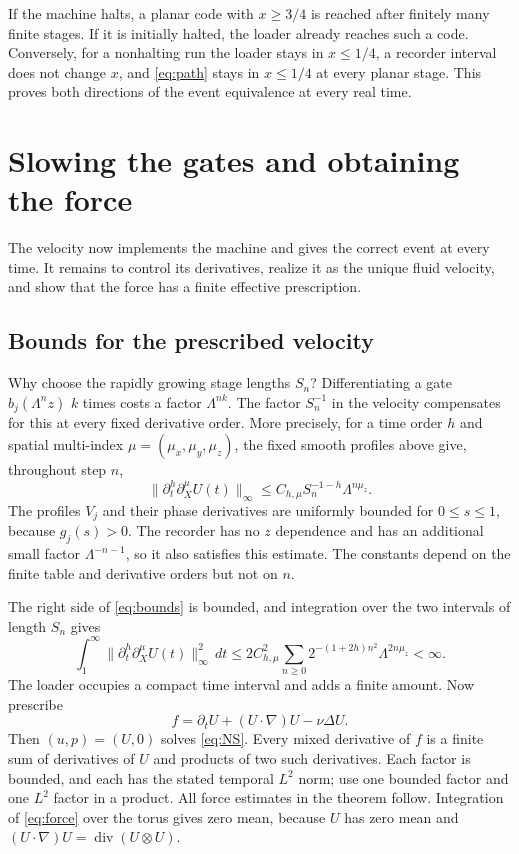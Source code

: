 \documentclass[11pt]{article}
\DeclareMathOperator{\diver}{div}
\begin{document}
If the machine halts, a planar code with $x\geq3/4$ is reached after
finitely many finite stages. If it is initially halted, the loader
already reaches such a code. Conversely, for a nonhalting run the loader
stays in $x\leq1/4$, a recorder interval does not change $x$, and
\eqref{eq:path} stays in $x\leq1/4$ at every planar stage. This proves
both directions of the event equivalence at every real time.

\section{Slowing the gates and obtaining the force}\label{sec:force}

The velocity now implements the machine and gives the correct event at
every time. It remains to control its derivatives, realize it as the unique
fluid velocity, and show that the force has a finite effective prescription.

\subsection{Bounds for the prescribed velocity}

Why choose the rapidly growing stage lengths $S_n$? Differentiating a
gate $b_j(\Lambda^n z)$ $k$ times costs a factor $\Lambda^{nk}$.
The factor $S_n^{-1}$ in the velocity compensates for this at every
fixed derivative order. More precisely, for a time order $h$ and
spatial multi-index $\mu=(\mu_x,\mu_y,\mu_z)$, the fixed smooth
profiles above give, throughout step $n$,
\begin{equation}\label{eq:bounds}
 \|\partial_t^h\partial_X^\mu U(t)\|_\infty
 \leq C_{h,\mu}S_n^{-1-h}\Lambda^{n\mu_z}.
\end{equation}
The profiles $V_j$ and their phase derivatives are uniformly bounded
for $0\leq s\leq1$, because $g_j(s)>0$. The recorder has no $z$
dependence and has an additional small factor $\Lambda^{-n-1}$, so it
also satisfies this estimate. The constants depend on the finite table
and derivative orders but not on $n$.

The right side of \eqref{eq:bounds} is bounded, and integration over
the two intervals of length $S_n$ gives
\[
 \int_1^\infty
 \|\partial_t^h\partial_X^\mu U(t)\|_\infty^2\,dt
 \leq 2C_{h,\mu}^2\sum_{n\geq0}
 2^{-(1+2h)n^2}\Lambda^{2n\mu_z}<\infty.
\]
The loader occupies a compact time interval and adds a finite amount.
Now prescribe
\begin{equation}\label{eq:force}
 f=\partial_tU+(U\cdot\nabla)U-\nu\Delta U.
\end{equation}
Then $(u,p)=(U,0)$ solves \eqref{eq:NS}. Every mixed derivative of $f$
is a finite sum of derivatives of $U$ and products of two such
derivatives. Each factor is bounded, and each has the stated temporal
$L^2$ norm; use one bounded factor and one $L^2$ factor in a product.
All force estimates in the theorem follow. Integration of
\eqref{eq:force} over the torus gives zero mean, because $U$ has zero
mean and $(U\cdot\nabla)U=\diver(U\otimes U)$.
\end{document}
